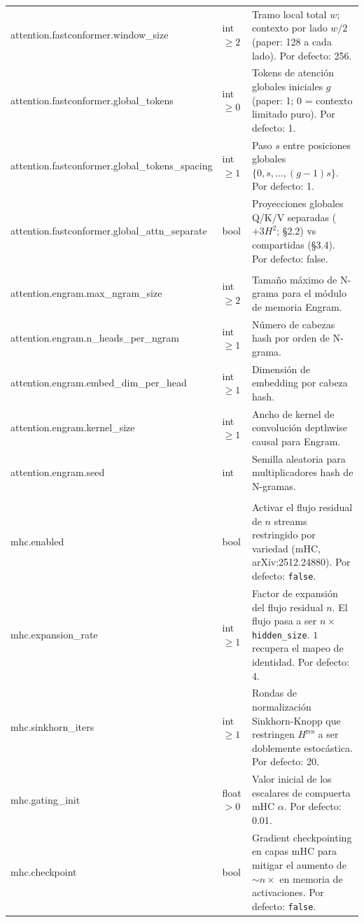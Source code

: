 \begin{longtable}{>{\ttfamily\footnotesize\raggedright\arraybackslash}p{5.6cm}>{\raggedright\arraybackslash}p{2.4cm}>{\raggedright\arraybackslash}p{6.9cm}}
\midrule
\multicolumn{3}{l}{\textit{model.attention.fastconformer.*}} \\
\midrule
attention.fastconformer.window\_size & int $\ge 2$ & Tramo local total $w$; contexto por lado $w/2$ (paper: 128 a cada lado). Por defecto: 256. \\
attention.fastconformer.global\_tokens & int $\ge 0$ & Tokens de atención globales iniciales $g$ (paper: 1; 0 = contexto limitado puro). Por defecto: 1. \\
attention.fastconformer.global\_tokens\_spacing & int $\ge 1$ & Paso $s$ entre posiciones globales $\{0, s, \dots, (g{-}1)s\}$. Por defecto: 1. \\
attention.fastconformer.global\_attn\_separate & bool & Proyecciones globales Q/K/V separadas ($+3H^2$; \S2.2) vs compartidas (\S3.4). Por defecto: false. \\
\midrule
\multicolumn{3}{l}{\textit{model.attention.engram.*}} \\
\midrule
attention.engram.max\_ngram\_size & int $\ge 2$ & Tamaño máximo de N-grama para el módulo de memoria Engram. \\
attention.engram.n\_heads\_per\_ngram & int $\ge 1$ & Número de cabezas hash por orden de N-grama. \\
attention.engram.embed\_dim\_per\_head & int $\ge 1$ & Dimensión de embedding por cabeza hash. \\
attention.engram.kernel\_size & int $\ge 1$ & Ancho de kernel de convolución depthwise causal para Engram. \\
attention.engram.seed & int & Semilla aleatoria para multiplicadores hash de N-gramas. \\
\midrule
\multicolumn{3}{l}{\textit{model.mhc.*}} \\
\midrule
mhc.enabled & bool & Activar el flujo residual de $n$ streams restringido por variedad (mHC, arXiv:2512.24880). Por defecto: \texttt{false}. \\
mhc.expansion\_rate & int $\ge 1$ & Factor de expansión del flujo residual $n$. El flujo pasa a ser $n \times$ \texttt{hidden\_size}. $1$ recupera el mapeo de identidad. Por defecto: 4. \\
mhc.sinkhorn\_iters & int $\ge 1$ & Rondas de normalización Sinkhorn-Knopp que restringen $H^{\text{res}}$ a ser doblemente estocástica. Por defecto: 20. \\
mhc.gating\_init & float $> 0$ & Valor inicial de los escalares de compuerta mHC $\alpha$. Por defecto: 0.01. \\
mhc.checkpoint & bool & Gradient checkpointing en capas mHC para mitigar el aumento de $\sim n\times$ en memoria de activaciones. Por defecto: \texttt{false}. \\

\end{longtable}
